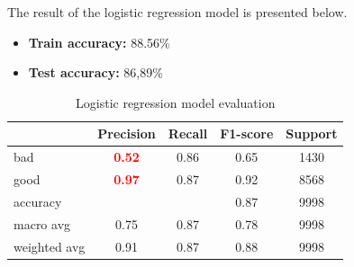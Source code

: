 The result of the logistic regression model is presented below.
\begin{itemize}
	\item \textbf{Train accuracy:} 88.56\%
	\item \textbf{Test accuracy:} 86,89\%
\end{itemize}


\begin{table}[h!]
	\centering
	\begin{tabular}{lcccc}
	\hline
				 & \multicolumn{1}{l}{\textbf{Precision}} & \multicolumn{1}{l}{\textbf{Recall}} & \multicolumn{1}{l}{\textbf{F1-score}} & \multicolumn{1}{l}{\textbf{Support}} \\ \hline
	bad          & \textcolor{red}{\textbf{0.52}}                          & 0.86                                & 0.65                                  & 1430                                 \\
	good         & \textcolor{red}{\textbf{0.97}}                          & 0.87                                & 0.92                                  & 8568                                 \\ \hline
	accuracy     &                                        &                                     & 0.87                                  & 9998                                 \\
	macro avg    & 0.75                                   & 0.87                                & 0.78                                  & 9998                                 \\
	weighted avg & 0.91                                   & 0.87                                & 0.88                                  & 9998  \\ \hline                              
	\end{tabular}
	\caption{\label{demo-table-5} Logistic regression model evaluation}
	\end{table}

